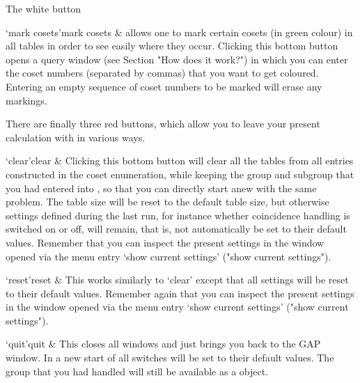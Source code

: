 \enditems

The white button

\beginitems

\>`mark cosets'{mark cosets} &
  allows one to mark certain cosets (in green colour) in all tables in
  order to see easily where they occur. Clicking this bottom button
  opens a query window (see Section "How does it work?") in which you
  can enter the coset numbers (separated by commas) that you want to get
  coloured. Entering an empty sequence of coset numbers to be marked
  will erase any markings.

\enditems


There are finally three red buttons, which allow you to leave your
present calculation with {\ITC} in various ways.

\beginitems

\>`clear'{clear} &
  Clicking this bottom button will clear all the tables from all
  entries constructed in the coset enumeration, while keeping the group
  and subgroup that you had entered into {\GAP}, so that you can directly
  start anew with the same problem. The table size will be reset to the
  default table size, but otherwise settings defined during the last
  run, for instance whether coincidence handling is switched on or off,
  will remain, that is, not automatically be set to their default
  values. Remember that you can inspect the present settings in the
  window opened via the menu entry `show current settings' ("show
  current settings").

\>`reset'{reset} &
  This works similarly to `clear' except that all settings will be reset
  to their default values. Remember again that you can inspect the
  present settings in the window opened via the menu entry `show current
  settings' ("show current settings").

\>`quit'{quit} &
  This closes all windows and just brings you back to the GAP
  window. In a new start of {\ITC} all switches will be set to their
  default values. The group that you had handled will still be available
  as a {\GAP} object.

\enditems



